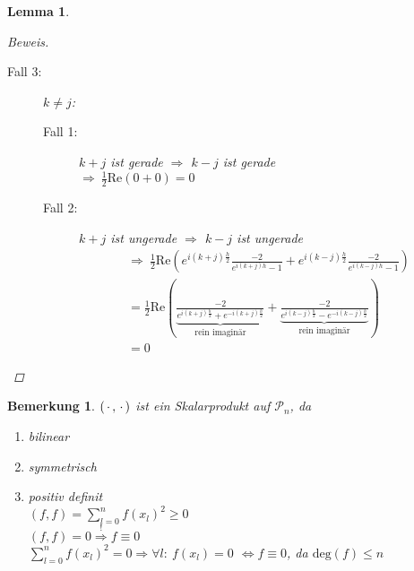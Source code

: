 \documentclass[12pt]{article}
\theoremstyle{break}
\newtheorem{lemma}[theorem]{Lemma}
\newtheorem*{comment*}{Bemerkung}
\begin{document}
\begin{lemma}
\begin{proof}[Beweis]
\begin{description}
  \item[Fall 3:] $k \neq j$:
    \begin{description}
      \item[Fall 1:] $k+j$ ist gerade $\Rightarrow$ $k-j$ ist gerade \\
        $\Rightarrow \medspace \frac{1}{2} \text{Re} \left(0+0\right) = 0$
      \item[Fall 2:] $k+j$ ist ungerade $\Rightarrow$ $k-j$ ist ungerade \\
        \begin{align*}
        &\Rightarrow \medspace  \frac{1}{2} \text{Re} \left( e^{i(k+j)\frac{h}{2}} \frac{-2}{ e^{i(k+j)h} - 1} + e^{i(k-j)\frac{h}{2}} \frac{-2}{ e^{i(k-j)h} - 1}\right)&\\
        &= \frac{1}{2} \text{Re} \left(\underbrace{\frac{-2}{ e^{i(k+j)\frac{h}{2}} + e^{-i(k+j)\frac{h}{2}}}}_{\text{rein imaginär}} +  \underbrace{\frac{-2}{ e^{i(k-j)\frac{h}{2}} - e^{-i(k-j)\frac{h}{2}}}}_{\text{rein imaginär}}\right)&\\
        &= 0
        \end{align*}
    \end{description}
\end{description}
\end{proof}
\end{lemma}

\begin{comment*}
$(\thinspace \cdot \thinspace, \thinspace \cdot \thinspace )$ ist ein Skalarprodukt auf $\mathcal{P}_n$, da 
\begin{enumerate}
  \item[i)] bilinear
  \item[ii)] symmetrisch
  \item[iii)] positiv definit \\
    $(f,f) = \sum_{l=0}^n f(x_l)^2 \geq 0$\\
    $(f,f) = 0 \overset{!}{\Rightarrow} f \equiv 0$\\
    $\sum_{l=0}^n f(x_l)^2 = 0 \Rightarrow \forall l: \medspace f(x_l) = 0$
    $\Leftrightarrow f \equiv 0$, da $\text{deg}(f) \leq n$ 
\end{enumerate}
\end{comment*}
\end{document}
